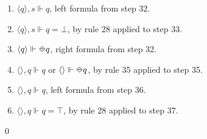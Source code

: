 \begin{myEx}
\begin{enumerate}
\item $\langle q \rangle, s \Vdash q$, left formula from step 32.\\ %

\item $\langle q \rangle, s \Vdash q = \bot$, by rule 28 applied to step 33.\\ %

\item $\langle q \rangle \Vdash \LTLonce q$, right formula from step 32.\\ %

\item $\langle \rangle, q \Vdash q$ or $\langle \rangle \Vdash \LTLonce q$, by rule 35 applied to step 35.\\ %

\item $\langle \rangle, q \Vdash q$, left formula from step 36.\\ %

\item $\langle \rangle, q \Vdash q = \top$, by rule 28 applied to step 37.\\ %
\end{enumerate}
\qed
\end{myEx}


